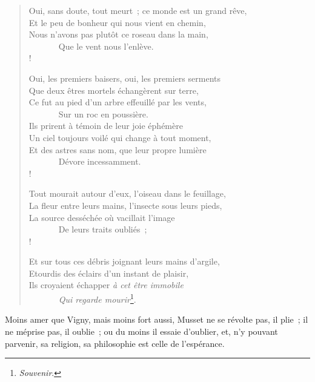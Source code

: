 \documentclass[french,twoside]{book} %
\begin{document}
\begin{verse}
Oui, sans doute, tout meurt ; ce monde est un grand rêve,\\
Et le peu de bonheur qui nous vient en chemin,\\
Nous n’avons pas plutôt ce roseau dans la main,\\
       Que le vent nous l’enlève.\\!

Oui, les premiers baisers, oui, les premiers serments\\
Que deux êtres mortels échangèrent sur terre,\\
Ce fut au pied d’un arbre effeuillé par les vents,\\
       Sur un roc en poussière.\\
Ils prirent à témoin de leur joie éphémère\\
Un ciel toujours voilé qui change à tout moment,\\
Et des astres sans nom, que leur propre lumière\\
       Dévore incessamment.\\!

Tout mourait autour d’eux, l’oiseau dans le feuillage,\\
La fleur entre leurs mains, l’insecte sous leurs pieds,\\
La source desséchée où vacillait l’image\\
       De leurs traits oubliés ;\\!

Et sur tous ces débris joignant leurs mains d’argile,\\
Etourdis des éclairs d’un instant de plaisir,\\
Ils croyaient échapper \emph{à cet être immobile}\\
       \emph{Qui regarde mourir}\footnote{\emph{Souvenir}.}.\\
\end{verse}

\noindent Moins amer que Vigny, mais moins fort aussi, Musset ne se révolte pas, il plie ; il ne méprise pas, il oublie ; ou du moins il essaie d’oublier, et, n’y pouvant parvenir, sa religion, sa philosophie est celle de l’espérance.\par
\end{document}
